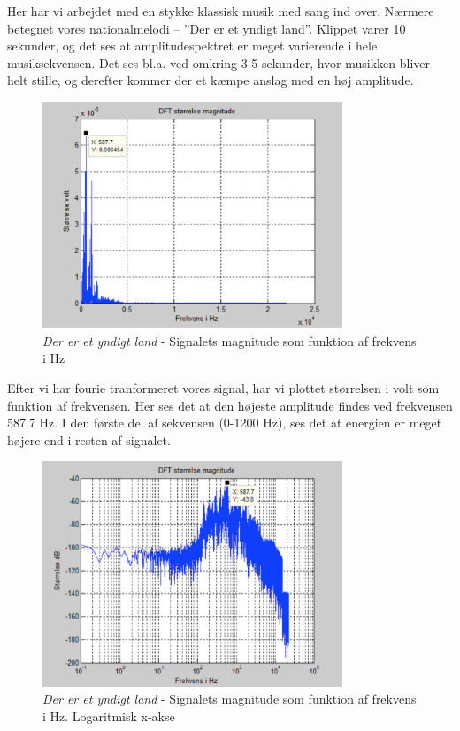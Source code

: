 Her har vi arbejdet med en stykke klassisk musik med sang ind over. Nærmere betegnet vores nationalmelodi – ”Der er et yndigt land”. Klippet varer 10 sekunder, og det ses at amplitudespektret er meget varierende i hele musiksekvensen. Det ses bl.a. ved omkring 3-5 sekunder, hvor musikken bliver helt stille, og derefter kommer der et kæmpe anslag med en høj amplitude.

\begin{figure}[H]
	\centering
	\includegraphics[width=0.8\textwidth]{Figurer/Nationalsang2}
	\caption{\textit{Der er et yndigt land} - Signalets magnitude som funktion af frekvens i Hz}
\end{figure}

Efter vi har fourie tranformeret vores signal, har vi plottet størrelsen i volt som funktion af frekvensen. Her ses det at den højeste amplitude findes ved frekvensen 587.7 Hz. I den første del af sekvensen (0-1200 Hz), ses det at energien er meget højere end i resten af signalet. 

\begin{figure}[H]
	\centering
	\includegraphics[width=0.8\textwidth]{Figurer/Nationalsang3}
	\caption{\textit{Der er et yndigt land} - Signalets magnitude som funktion af frekvens i Hz. Logaritmisk x-akse}
\end{figure}

